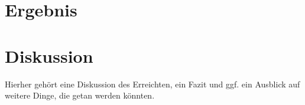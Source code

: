 \documentclass[	12pt, 
				a4paper, 
				BCOR=10mm, %
				DIV=12, 
				parskip=half, %
				headings=small, %
				twoside, %
				ngerman,
				bibliography=totoc,index=totoc, listof=totoc,
				numbers=noendperiod
				]{scrbook} %
\theoremstyle{plain}%
\theoremstyle{definition}
\theoremstyle{remark}
\begin{document}
\section{Ergebnis}
\label{sec:ergebnis}
\section{Diskussion}
\label{sec:diskussion}
Hierher gehört eine Diskussion des Erreichten, ein Fazit und ggf. ein Ausblick auf weitere Dinge, die getan
werden könnten.


\newpage
 \printbibliography	%

\appendix 				%


\end{document}

